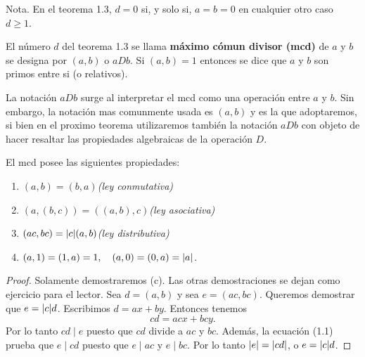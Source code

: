 \documentclass[12pt,a4paper]{book}
\begin{document}
    Nota. En el teorema 1.3, $d=0$ si, y solo si, $a=b=0$ en cualquier otro caso $d\geq1.$

    \begin{definicion}
        El número $d$ del teorema 1.3 se llama \textbf{máximo cómun divisor (mcd)} de $a$ y
        $b$ se designa por $(a,b)$ o $aDb$. Si $(a,b)=1$ entonces se dice que $a$ y $b$ son
        primos entre si (o relativos).
    \end{definicion}

    La notación $aDb$ surge al interpretar el mcd como una operación entre $a$ y $b$. Sin
    embargo, la notación mas comunmente usada es $(a,b)$ y es la que adoptaremos, si bien
    en el proximo teorema utilizaremos también la notación $aDb$ con objeto de hacer resaltar
    las propiedades algebraicas de la operación $D$.
    
    \begin{teorema}
        El mcd posee las siguientes propiedades:
        \begin{enumerate}
            \item[(a)] $(a,b)=(b,a)$\hfill\textit{(ley conmutativa)}
            \item[(b)] $(a,(b,c))=((a,b),c)$\hfill\textit{(ley asociativa)}
            \item[(c)] $(ac,bc)=\abs{c}(a,b)$\hfill\textit{(ley distributiva)}
            \item[(d)] $(a,1)=(1,a)=1,\quad (a,0)=(0,a)=\abs{a}$.   
        \end{enumerate}
    \end{teorema}

    \begin{proof}
        Solamente demostraremos (c). Las otras demostraciones se dejan como ejercicio para el
        lector. Sea $d=(a,b)$ y sea $e=(ac,bc)$. Queremos demostrar que $e=\abs{c}d$. Escribimos
        $d=ax+by$. Entonces tenemos
        \begin{equation}
            cd=acx+bcy.
        \end{equation}
        Por lo tanto $cd\mid e$ puesto que $cd$ divide a $ac$ y $bc$. Además, la ecuación (1.1)
        prueba que $e\mid cd$ puesto que $e\mid ac$ y $e\mid bc$. Por lo tanto $\abs{e}=\abs{cd}$,
        o $e=\abs{c}d$.
    \end{proof}
\end{document}
